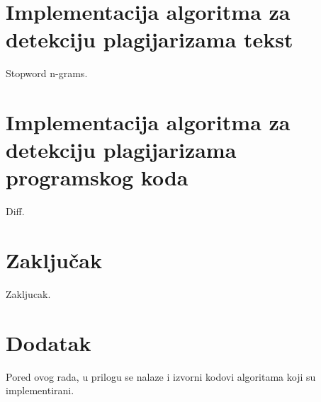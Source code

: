 \documentclass[a4paper]{article}
\begin{document}
\section{Implementacija algoritma za detekciju plagijarizama tekst}
\label{sec:implementacija algoritma za detekciju plagijarizama tekst}

Stopword n-grams.


\section{Implementacija algoritma za detekciju plagijarizama programskog koda}
\label{sec:implementacija algoritma za detekciju plagijarizama programskog koda}

Diff.

\section{Zaključak}
\label{sec:zakljucak}

Zakljucak. 


\appendix
 


\appendix
\section{Dodatak}

Pored ovog rada, u prilogu se nalaze i izvorni kodovi algoritama koji su implementirani.
\end{document}
